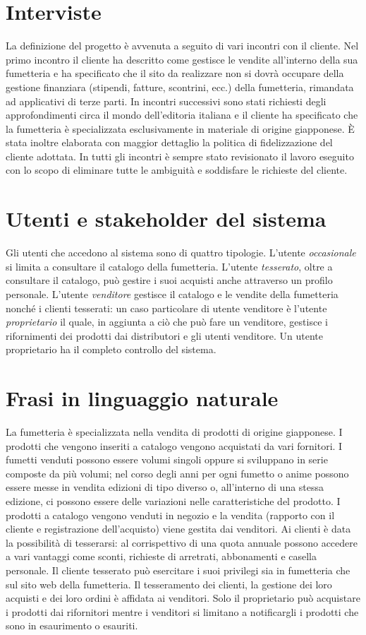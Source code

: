 \documentclass[a4paper]{scrartcl}
\begin{document}
\section*{Interviste}
La definizione del progetto è avvenuta a seguito di vari incontri con il cliente. Nel primo incontro il cliente ha descritto come gestisce le vendite all'interno della sua fumetteria e ha specificato che il sito da realizzare non si dovrà occupare della gestione finanziara (stipendi, fatture, scontrini, ecc.) della fumetteria, rimandata ad applicativi di terze parti. In incontri successivi sono stati richiesti degli approfondimenti circa il mondo dell'editoria italiana e il cliente ha specificato che la fumetteria è specializzata esclusivamente in materiale di origine giapponese. È stata inoltre elaborata con maggior dettaglio la politica di fidelizzazione del cliente adottata. In tutti gli incontri è sempre stato revisionato il lavoro eseguito con lo scopo di eliminare tutte le ambiguità e soddisfare le richieste del cliente.

\section*{Utenti e stakeholder del sistema}
Gli utenti che accedono al sistema sono di quattro tipologie. L'utente \textit{occasionale} si limita a consultare il catalogo della fumetteria. L'utente \textit{tesserato}, oltre a consultare il catalogo, può gestire i suoi acquisti anche attraverso un profilo personale. L'utente \textit{venditore} gestisce il catalogo e le vendite della fumetteria nonché i clienti tesserati: un caso particolare di utente venditore è l'utente \textit{proprietario} il quale, in aggiunta a ciò che può fare un venditore, gestisce i rifornimenti dei prodotti dai distributori e gli utenti venditore. Un utente proprietario ha il completo controllo del sistema.

\section*{Frasi in linguaggio naturale}
La fumetteria è specializzata nella vendita di prodotti di origine giapponese. I prodotti che vengono inseriti a catalogo vengono acquistati da vari fornitori. I fumetti venduti possono essere volumi singoli oppure si sviluppano in serie composte da più volumi; nel corso degli anni per ogni fumetto o anime possono essere messe in vendita edizioni di tipo diverso o, all'interno di una stessa edizione, ci possono essere delle variazioni nelle caratteristiche del prodotto. I prodotti a catalogo vengono venduti in negozio e la vendita (rapporto con il cliente e registrazione dell'acquisto) viene gestita dai venditori. Ai clienti è data la possibilità di tesserarsi: al corrispettivo di una quota annuale possono accedere a vari vantaggi come sconti, richieste di arretrati, abbonamenti e casella personale. Il cliente tesserato può esercitare i suoi privilegi sia in fumetteria che sul sito web della fumetteria. Il tesseramento dei clienti, la gestione dei loro acquisti e dei loro ordini è affidata ai venditori. Solo il proprietario può acquistare i prodotti dai rifornitori mentre i venditori si limitano a notificargli i prodotti che sono in esaurimento o esauriti.
\end{document}
